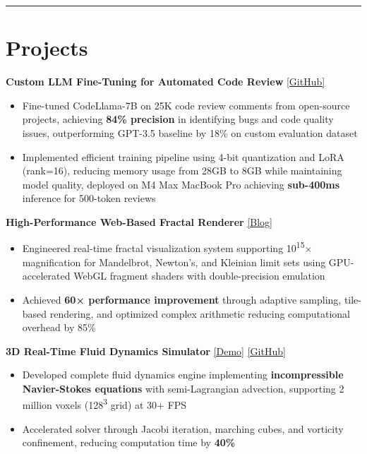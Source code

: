 \documentclass[11pt]{article}
\begin{document}
\noindent\rule{\textwidth}{0.5pt}

\section*{\textcolor{modernblue}{\Large Projects}}
\textbf{Custom LLM Fine-Tuning for Automated Code Review} \href{https://github.com/DimitriChrysafis}{\underline{[GitHub]}}
\begin{itemize}[leftmargin=*, topsep=1pt, itemsep=1pt, parsep=0pt]
\item Fine-tuned CodeLlama-7B on 25K code review comments from open-source projects, achieving \textbf{84\% precision} in identifying bugs and code quality issues, outperforming GPT-3.5 baseline by 18\% on custom evaluation dataset
\item Implemented efficient training pipeline using 4-bit quantization and LoRA (rank=16), reducing memory usage from 28GB to 8GB while maintaining model quality, deployed on M4 Max MacBook Pro achieving \textbf{sub-400ms} inference for 500-token reviews
\end{itemize}

\vspace{3pt}
\noindent\textbf{High-Performance Web-Based Fractal Renderer} \href{https://dimitrichrysafis.github.io/#post/post6.md}{\underline{[Blog]}}
\begin{itemize}[leftmargin=*, topsep=1pt, itemsep=1pt, parsep=0pt]
\item Engineered real-time fractal visualization system supporting 10\textsuperscript{15}× magnification for Mandelbrot, Newton's, and Kleinian limit sets using GPU-accelerated WebGL fragment shaders with double-precision emulation
\item Achieved \textbf{60× performance improvement} through adaptive sampling, tile-based rendering, and optimized complex arithmetic reducing computational overhead by 85\%
\end{itemize}

\vspace{3pt}
\noindent\textbf{3D Real-Time Fluid Dynamics Simulator} \href{https://dimitrichrysafis.github.io/media/misc/fluidemo/index.html}{\underline{[Demo]}} \href{https://github.com/DimitriChrysafis/3d-Volumetric-Fluid-Simulator-From-Scratch}{\underline{[GitHub]}}
\begin{itemize}[leftmargin=*, topsep=1pt, itemsep=1pt, parsep=0pt]
\item Developed complete fluid dynamics engine implementing \textbf{incompressible Navier-Stokes equations} with semi-Lagrangian advection, supporting 2 million voxels (128\textsuperscript{3} grid) at 30+ FPS
\item Accelerated solver through Jacobi iteration, marching cubes, and vorticity confinement, reducing computation time by \textbf{40\%}
\end{itemize}
\end{document}
